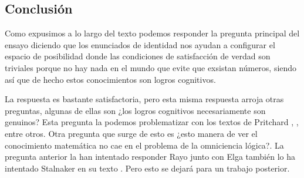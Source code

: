 \documentclass[]{article}
\begin{document}
\subsection*{Conclusión}
Como expusimos a lo largo del texto podemos responder la 
pregunta principal del ensayo diciendo que los 
enunciados de identidad nos ayudan a configurar el espacio 
de posibilidad donde las condiciones de satisfacción
de verdad son triviales porque no hay nada en el mundo 
que evite que exsistan números, siendo así que de hecho 
estos conocimientos son logros cognitivos. 

La respuesta es bastante satisfactoria, pero esta misma 
respuesta arroja otras preguntas, algunas de ellas 
son ¿los logros cognitivos necesariamente son 
genuinos? Esta pregunta la podemos problematizar 
con los textos de Pritchard 
\cite{pritchard2016epistemic}, \cite{pritchard2009knowledge}
, entre otros. Otra pregunta que surge de esto es 
¿esto manera de ver el conocimiento matemática no 
cae en el problema de la omniciencia lógica?. La pregunta 
anterior la han intentado responder Rayo junto con Elga 
\cite{elga2022fragmentation} también lo ha intentado 
Stalnaker en su texto \cite{stalnaker1991problem}. 
Pero esto se dejará para un trabajo posterior.



\end{document}
